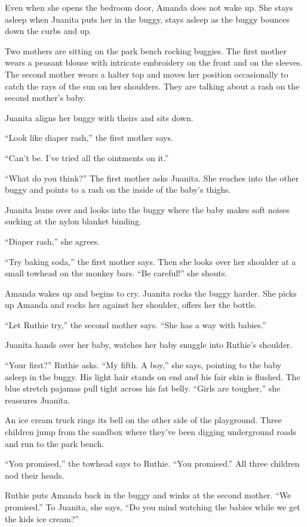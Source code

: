 \documentclass[
]{article}
\begin{document}
Even when she opens the bedroom door, Amanda does not wake up. She stays
asleep when Juanita puts her in the buggy, stays asleep as the buggy
bounces down the curbs and up.

Two mothers are sitting on the park bench rocking buggies. The first
mother wears a peasant blouse with intricate embroidery on the front and
on the sleeves. The second mother wears a halter top and moves her
position occasionally to catch the rays of the sun on her shoulders.
They are talking about a rash on the second mother's baby.

Juanita aligns her buggy with theirs and sits down.

``Look like diaper rash,'' the first mother says.

``Can't be. I've tried all the ointments on it.''

``What do you think?'' The first mother asks Juanita. She reaches into
the other buggy and points to a rash on the inside of the baby's thighs.

Juanita leans over and looks into the buggy where the baby makes soft
noises sucking at the nylon blanket binding.

``Diaper rash,'' she agrees.

``Try baking soda,'' the first mother says. Then she looks over her
shoulder at a small towhead on the monkey bars. ``Be careful!'' she
shouts.

Amanda wakes up and begins to cry. Juanita rocks the buggy harder. She
picks up Amanda and rocks her against her shoulder, offers her the
bottle.

``Let Ruthie try,'' the second mother says. ``She has a way with
babies.''

Juanita hands over her baby, watches her baby snuggle into Ruthie's
shoulder.

``Your first?'' Ruthie asks. ``My fifth. A boy,'' she says, pointing to
the baby asleep in the buggy. His light hair stands on end and his fair
skin is flushed. The blue stretch pajamas pull tight across his fat
belly. ``Girls are tougher,'' she reassures Juanita.

An ice cream truck rings its bell on the other side of the playground.
Three children jump from the sandbox where they've been digging
underground roads and run to the park bench.

``You promised,'' the towhead says to Ruthie. ``You promised.'' All
three children nod their heads.

Ruthie puts Amanda back in the buggy and winks at the second mother.
``We promised.'' To Juanita, she says, ``Do you mind watching the babies
while we get the kids ice cream?''
\end{document}
